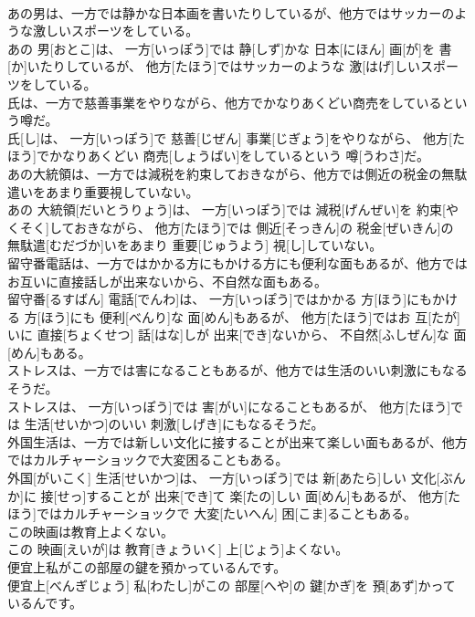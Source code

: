 \documentclass[8pt]{extreport}
\begin{document}
\begin{CJK}{UTF8}{min}
\\	あの男は、一方では静かな日本画を書いたりしているが、他方ではサッカーのような激しいスポーツをしている。	
\\	あの 男[おとこ]は、 一方[いっぽう]では 静[しず]かな 日本[にほん] 画[が]を 書[か]いたりしているが、 他方[たほう]ではサッカーのような 激[はげ]しいスポーツをしている。
\\	氏は、一方で慈善事業をやりながら、他方でかなりあくどい商売をしているという噂だ。	
\\	氏[し]は、 一方[いっぽう]で 慈善[じぜん] 事業[じぎょう]をやりながら、 他方[たほう]でかなりあくどい 商売[しょうばい]をしているという 噂[うわさ]だ。
\\	あの大統領は、一方では減税を約束しておきながら、他方では側近の税金の無駄遣いをあまり重要視していない。	
\\	あの 大統領[だいとうりょう]は、 一方[いっぽう]では 減税[げんぜい]を 約束[やくそく]しておきながら、 他方[たほう]では 側近[そっきん]の 税金[ぜいきん]の 無駄遣[むだづか]いをあまり 重要[じゅうよう] 視[し]していない。
\\	留守番電話は、一方ではかかる方にもかける方にも便利な面もあるが、他方ではお互いに直接話しが出来ないから、不自然な面もある。	
\\	留守番[るすばん] 電話[でんわ]は、 一方[いっぽう]ではかかる 方[ほう]にもかける 方[ほう]にも 便利[べんり]な 面[めん]もあるが、 他方[たほう]ではお 互[たが]いに 直接[ちょくせつ] 話[はな]しが 出来[でき]ないから、 不自然[ふしぜん]な 面[めん]もある。
\\	ストレスは、一方では害になることもあるが、他方では生活のいい刺激にもなるそうだ。	
\\	ストレスは、 一方[いっぽう]では 害[がい]になることもあるが、 他方[たほう]では 生活[せいかつ]のいい 刺激[しげき]にもなるそうだ。
\\	外国生活は、一方では新しい文化に接することが出来て楽しい面もあるが、他方ではカルチャーショックで大変困ることもある。	
\\	外国[がいこく] 生活[せいかつ]は、 一方[いっぽう]では 新[あたら]しい 文化[ぶんか]に 接[せっ]することが 出来[でき]て 楽[たの]しい 面[めん]もあるが、 他方[たほう]ではカルチャーショックで 大変[たいへん] 困[こま]ることもある。
\\	この映画は教育上よくない。	
\\	この 映画[えいが]は 教育[きょういく] 上[じょう]よくない。
\\	便宜上私がこの部屋の鍵を預かっているんです。	
\\	便宜上[べんぎじょう] 私[わたし]がこの 部屋[へや]の 鍵[かぎ]を 預[あず]かっているんです。

\end{CJK}
\end{document}
